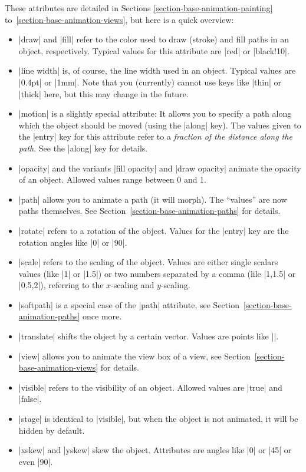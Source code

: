 \begin{command}{\pgfanimateattribute{}}
  These attributes are detailed in
  Sections \ref{section-base-animation-painting}
  to~\ref{section-base-animation-views}, but here is a quick overview:
  \begin{itemize}
  \item |draw| and |fill| refer to the color used to
    draw (stroke) and fill paths in an object, respectively. Typical
    values for this attribute are |red| or |black!10|.
  \item |line width| is, of course, the line width used in an
    object. Typical values are |0.4pt| or |1mm|. Note that you
    (currently) cannot use keys like |thin| or |thick| here, but this
    may change in the future.
  \item |motion| is a slightly special attribute: It allows you to
    specify a path along which the object should be moved (using the
    |along| key). The values given to the |entry| key for this
    attribute refer to a \emph{fraction of the distance along the
      path}. See the |along| key for details.
  \item |opacity| and the variants |fill opacity| and |draw opacity|
    animate the opacity of an object. Allowed values range between 0
    and 1.
  \item |path| allows you to animate a path (it will
    morph). The ``values'' are now paths themselves. See
    Section~\ref{section-base-animation-paths} for details.
  \item |rotate| refers to a rotation of the object. Values for the
    |entry| key are the rotation angles like |0| or |90|.
  \item |scale| refers to the scaling of the object. Values are either
    single scalars values (like |1| or  |1.5|) or two numbers
    separated by a comma (lile |1,1.5| or |0.5,2|), referring to the
    $x$-scaling and $y$-scaling.
  \item |softpath| is a special case of the |path| attribute, see
    Section~\ref{section-base-animation-paths} once more.
  \item |translate| shifts the object by a certain vector. Values are
    points like |\pgfpoint{1cm}{2cm}|.
  \item |view| allows you to animate the view box of a view, see
    Section~\ref{section-base-animation-views} for details.
  \item |visible| refers to the visibility of an object. Allowed
    values are |true| and |false|.
  \item |stage| is identical to |visible|, but when the object is not
    animated, it will be hidden by default.
  \item |xskew| and |yskew| skew the object. Attributes are angles
    like |0| or |45| or even |90|.
  \end{itemize}


\end{command}
